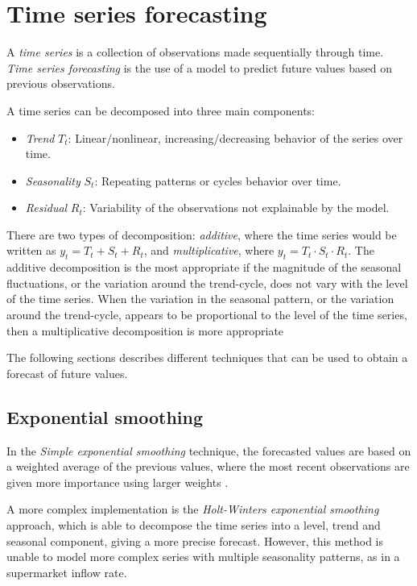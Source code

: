 \section{Time series forecasting}
\label{sec:time_series_forecasting}

A \emph{time series} is a collection of observations made sequentially through time. \emph{Time series forecasting} is the use of a model to predict future values based on previous observations.

A time series can be decomposed into three main components:
\begin{itemize}
  \item \emph{Trend} \( T_t \): Linear/nonlinear, increasing/decreasing behavior of the series over time.
  \item \emph{Seasonality} \( S_t \): Repeating patterns or cycles behavior over time.
  \item \emph{Residual} \( R_t \): Variability of the observations not explainable by the model.
\end{itemize}

There are two types of decomposition: \emph{additive}, where the time series would be written as \( y_t = T_t + S_t + R_t \), and \emph{multiplicative}, where \( y_t = T_t \cdot S_t \cdot R_t \).
The additive decomposition is the most appropriate if the magnitude of the seasonal fluctuations, or the variation around the trend-cycle, does not vary with the level of the time series. When the variation in the seasonal pattern, or the variation around the trend-cycle, appears to be proportional to the level of the time series, then a multiplicative decomposition is more appropriate

The following sections describes different techniques that can be used to obtain a forecast of future values.


\subsection{Exponential smoothing}
\label{subsec:exponential_smoothing}
In the \emph{Simple exponential smoothing} technique, the forecasted values are based on a weighted average of the previous values, where the most recent observations are given more importance using larger weights \cite{hyndman}.

A more complex implementation is the \emph{Holt-Winters exponential smoothing} approach, which is able to decompose the time series into a level, trend and seasonal component, giving a more precise forecast. However, this method is unable to model more complex series with multiple seasonality patterns, as in a supermarket inflow rate.

